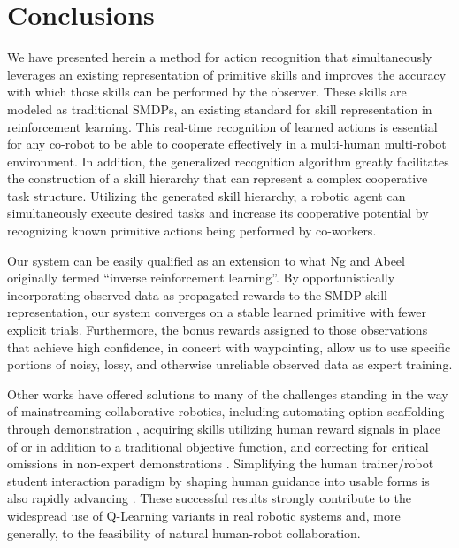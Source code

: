 \documentclass[letterpaper]{article}
\begin{document}
\section{Conclusions}
\label{sec:conclusions}
We have presented herein a method for action recognition that simultaneously leverages an existing representation of primitive skills and improves the accuracy with which those skills can be performed by the observer.  These skills are modeled as traditional SMDPs, an existing standard for skill representation in reinforcement learning.  This real-time recognition of learned actions is essential for any co-robot to be able to cooperate effectively in a multi-human multi-robot environment.  In addition, the generalized recognition algorithm greatly facilitates the construction of a skill hierarchy that can represent a complex cooperative task structure.  Utilizing the generated skill hierarchy, a robotic agent can simultaneously execute desired tasks and increase its  cooperative potential by recognizing known primitive actions being performed by co-workers.

Our system can be easily qualified as an extension to what Ng and Abeel  originally termed ``inverse reinforcement learning''.  By opportunistically incorporating observed data as propagated rewards to the SMDP skill representation, our system converges on a stable learned primitive with fewer explicit trials.  Furthermore, the bonus rewards assigned to those observations that achieve high confidence, in concert with waypointing, allow us to use specific portions of noisy, lossy, and otherwise unreliable observed data as expert training.

Other works have offered solutions to many of the challenges standing in the way of mainstreaming collaborative robotics, including automating option scaffolding through demonstration \cite{AutoSkillAcquisition}, acquiring skills utilizing human reward signals in place of \cite{TAMER} or in addition to \cite{TeacherRL} a traditional objective function, and correcting for critical omissions in non-expert demonstrations \cite{PerspectiveTaking}. Simplifying the human trainer/robot student interaction paradigm by shaping human guidance into usable forms is also rapidly advancing \cite{TAMER,Clicker,AdviceTaking,TeacherRL,DemonstrationRL}. These successful results strongly contribute to the widespread use of Q-Learning variants in real robotic systems and, more generally, to the feasibility of natural human-robot collaboration.



\end{document}
